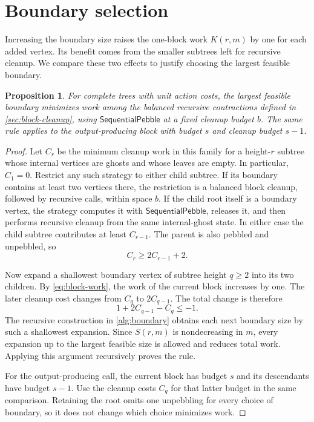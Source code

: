 \documentclass[11pt]{article}
\newtheorem{proposition}[proposition]{Proposition}
\theoremstyle{definition}
\theoremstyle{remark}
\newcommand{\Fast}{\mathsf{SequentialPebble}}
\begin{document}
\appendix

\section{Boundary selection}
\label{app:sequential}

Increasing the boundary size raises the one-block work $K(r,m)$ by one for each added vertex. Its benefit comes from the smaller subtrees left for recursive cleanup. We compare these two effects to justify choosing the largest feasible boundary.

\begin{proposition}
\label{prop:greedy-boundary}
For complete trees with unit action costs, the largest feasible boundary minimizes work among the balanced recursive contractions defined in \cref{sec:block-cleanup}, using $\Fast$ at a fixed cleanup budget $b$. The same rule applies to the output-producing block with budget $s$ and cleanup budget $s-1$.
\end{proposition}
\begin{proof}
Let $C_r$ be the minimum cleanup work in this family for a height-$r$ subtree whose internal vertices are ghosts and whose leaves are empty. In particular, $C_1=0$. Restrict any such strategy to either child subtree. If its boundary contains at least two vertices there, the restriction is a balanced block cleanup, followed by recursive calls, within space $b$. If the child root itself is a boundary vertex, the strategy computes it with $\Fast$, releases it, and then performs recursive cleanup from the same internal-ghost state. In either case the child subtree contributes at least $C_{r-1}$. The parent is also pebbled and unpebbled, so
\[
 C_r\ge2C_{r-1}+2.
\]

Now expand a shallowest boundary vertex of subtree height $q\ge2$ into its two children. By \cref{eq:block-work}, the work of the current block increases by one. The later cleanup cost changes from $C_q$ to $2C_{q-1}$. The total change is therefore
\[
1+2C_{q-1}-C_q\le-1.
\]
The recursive construction in \cref{alg:boundary} obtains each next boundary size by such a shallowest expansion. Since $S(r,m)$ is nondecreasing in $m$, every expansion up to the largest feasible size is allowed and reduces total work. Applying this argument recursively proves the rule.

For the output-producing call, the current block has budget $s$ and its descendants have budget $s-1$. Use the cleanup costs $C_q$ for that latter budget in the same comparison. Retaining the root omits one unpebbling for every choice of boundary, so it does not change which choice minimizes work.
\end{proof}
\end{document}
